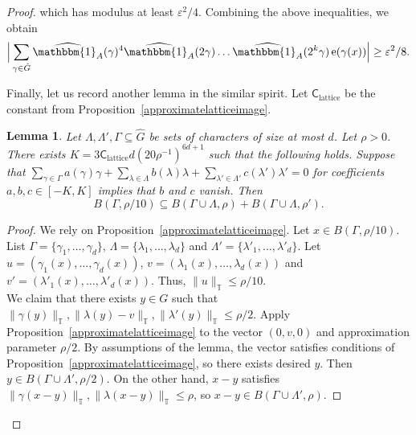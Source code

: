 \documentclass[a4paper,11pt]{article}
\numberwithin{theorem}{section}
\newtheorem{lemma}[theorem]{Lemma}
\theoremstyle{definition}
\newcommand\id{\mathbbm{1}}
\newcommand{\on}[1]{
	\operatorname{#1}
}
\begin{document}
\begin{proof}
    which has modulus at least $\varepsilon^2/4$. Combining the above inequalities, we obtain 
    \[\Big|\sum_{\gamma \in \hat{G}} \widehat{\id_A}(\gamma)^4 \widehat{\id_A}(2\gamma)\dots \widehat{\id_A}(2^k\gamma)\on{e}(\gamma(x))\Big| \geq \varepsilon^2/8.\qedhere\]

    Finally, let us record another lemma in the similar spirit. Let $\mathsf{C}_{\on{lattice}}$ be the constant from Proposition~\ref{approximatelatticeimage}.

    \begin{lemma}\label{qrsumbohrs}
        Let $\Lambda, \Lambda', \Gamma \subseteq \hat{G}$ be sets of characters of size at most $d$. Let $\rho > 0$. There exists $K = 3\mathsf{C}_{\on{lattice}}d (20\rho^{-1})^{6d + 1}$ such that the following holds. Suppose that $\sum_{\gamma \in \Gamma} a(\gamma) \gamma + \sum_{\lambda \in \Lambda} b(\lambda) \lambda  + \sum_{\lambda' \in \Lambda'} c(\lambda') \lambda' = 0$ for coefficients $a, b, c \in [-K, K]$ implies that $b$ and $c$ vanish. Then
        \[B(\Gamma, \rho/10) \subseteq B(\Gamma \cup \Lambda, \rho) + B(\Gamma \cup \Lambda, \rho').\]
    \end{lemma}

    \begin{proof}
        We rely on Proposition~\ref{approximatelatticeimage}. Let $x \in B(\Gamma, \rho/10)$. List $\Gamma = \{\gamma_1, \dots, \gamma_d\}$, $\Lambda = \{\lambda_1, \dots, \lambda_d\}$ and $\Lambda' = \{\lambda'_1, \dots, \lambda'_d\}$. Let $u = (\gamma_1(x), \dots, \gamma_d(x))$, $v = (\lambda_1(x), \dots, \lambda_d(x))$ and $v' = (\lambda'_1(x), \dots, \lambda'_d(x))$. Thus, $\|u\|_{\mathbb{T}} \leq \rho/10$.\\

        We claim that there exists $y \in G$ such that $\|\gamma(y)\|_{\mathbb{T}}, \|\lambda(y) - v\|_{\mathbb{T}}, \|\lambda'(y)\|_{\mathbb{T}} \leq \rho/2$. Apply Proposition~\ref{approximatelatticeimage} to the vector $(0, v, 0)$ and approximation parameter $\rho/2$. By assumptions  of the lemma, the vector satisfies conditions of Proposition~\ref{approximatelatticeimage}, so there exists desired $y$. Then $y \in B(\Gamma \cup \Lambda', \rho/2)$. On the other hand, $x - y$ satisfies $\|\gamma(x-y)\|_{\mathbb{T}}, \|\lambda(x - y)\|_{\mathbb{T}} \leq \rho$, so $x -y \in B(\Gamma \cup \Lambda', \rho)$.
    \end{proof}
    


    

    
\end{proof}
\end{document}
